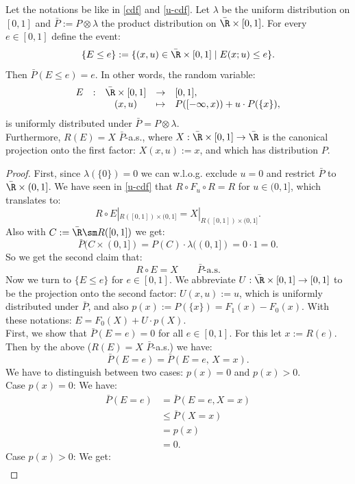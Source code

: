 \begin{Lem}
    \label{unif-cdf}
Let the notations be like in \ref{cdf} and \ref{u-cdf}. 
Let $\lambda$ be the uniform distribution on $[0,1]$ and 
$\bar P := P \otimes \lambda$ the product distribution on $\bar\R \times [0,1]$.
For every $e \in [0,1]$ define the event:
\[ \{ E \le e\} := \{ (x,u) \in \bar\R \times [0,1] \;|\; E(x;u) \le e\}.  \]
Then $\bar P(E \le e) = e$.
In other words, the random variable: 
\[ \begin{array}{ccccl} 
 E &:& \bar\R\times[0,1] &\to& [0,1], \\
   && (x,u) &\mapsto& P([-\infty,x))+ u \cdot P(\{x\}),
\end{array}%
 \]
is uniformly distributed under $\bar P=P\otimes\lambda$.\\
Furthermore, $R(E) = X$ $\bar P$-a.s., where $X: \bar\R \times [0,1] \to \bar\R$ is the canonical projection onto the first factor: $X(x,u):=x$, and which has distribution $P$.
\begin{proof}
    First, since $\lambda(\{0\})=0$ we can w.l.o.g. exclude $u=0$ and restrict $\bar P$ to 
    $\bar\R \times (0,1]$.
    We have seen in \ref{u-cdf} that $R \circ F_u \circ R =R$ for $u \in (0,1]$, 
    which translates to:
 \[ R \circ E |_{R([0,1]) \times (0,1]} = X|_{R([0,1]) \times (0,1]}. \]
 Also with $C:=\bar\R \sm R([0,1])$ we get:
 \[\bar P( C \times (0,1]) = P(C) \cdot \lambda((0,1]) = 0 \cdot 1 = 0.\]
 So we get the second claim that:
 \[R \circ E = X \qquad \bar P\text{-a.s.}\]%
%
 Now we turn to $\{E \le e\}$ for $e \in [0,1]$. We abbreviate  
 $U: \bar\R \times [0,1] \to [0,1]$ to be the projection onto the
second factor: $U(x,u):=u$, which is uniformly distributed under $\bar P$, 
and also $p(x):=  P(\{x\}) = F_1(x)-F_0(x)$. With these notations: $E=F_0(X)+U \cdot p(X)$.\\
%
First, we  show that $\bar P(E=e)=0$ for all $e \in[0,1]$. For this let $x:=R(e)$. 
 Then by the above ($R(E)=X$ $\bar P$-a.s.) we have:
\[ \bar P(E=e) = \bar P(E=e,\, X=x).\]
We have to distinguish between two cases: $p(x)=0$ and $p(x)>0$.\\
 Case $p(x)=0$: We have:
 \begin{align*}
     \bar P(E=e) &= \bar P(E=e,X=x)\\
                  &\le \bar P(X=x) \\
                  & = p(x) \\
                  & =0.
 \end{align*}
 Case $p(x) > 0$: We get:
 \begin{align*}

\end{align*}
\end{proof}
\end{Lem}
